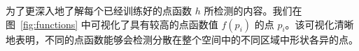 为了更深入地了解每个已经训练好的点函数 $h$ 所检测的内容。我们在图~\ref{fig:functions} 中可视化了具有较高的点函数值 $f(p_i)$ 的点 $p_i$。该可视化清晰地表明，不同的点函数能够会检测分散在整个空间中的不同区域中形状各异的点。




